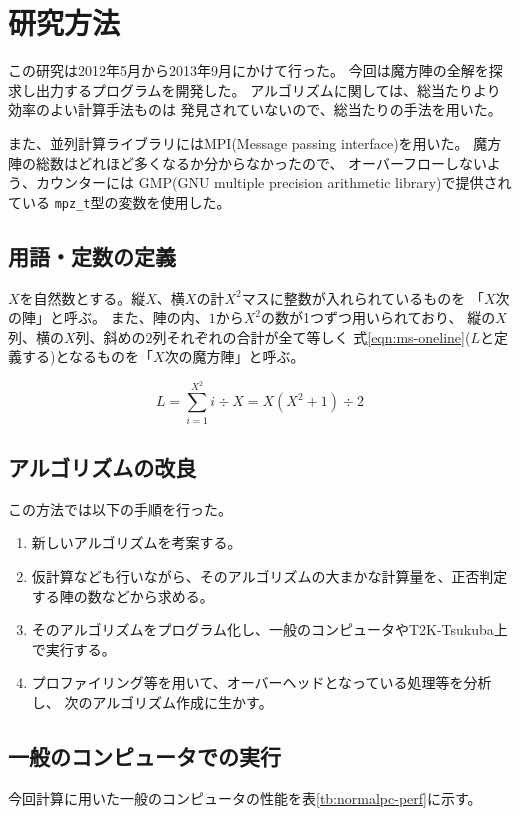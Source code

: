 \section{研究方法}
この研究は2012年5月から2013年9月にかけて行った。
今回は魔方陣の全解を探求し出力するプログラムを開発した。
アルゴリズムに関しては、総当たりより効率のよい計算手法ものは
発見されていないので、総当たりの手法を用いた。

また、並列計算ライブラリにはMPI(Message passing interface)を用いた。
魔方陣の総数はどれほど多くなるか分からなかったので、
オーバーフローしないよう、カウンターには
GMP(GNU multiple precision arithmetic library)で提供されている
{\tt mpz\_t}型の変数を使用した。

\subsection{用語・定数の定義}
$X$を自然数とする。縦$X$、横$X$の計$X^2$マスに整数が入れられているものを
「$X$次の陣」と呼ぶ。
また、陣の内、$1$から$X^2$の数が1つずつ用いられており、
縦の$X$列、横の$X$列、斜めの$2$列それぞれの合計が全て等しく
式\ref{eqn:ms-oneline}($L$と定義する)となるものを「$X$次の魔方陣」と呼ぶ。

\begin{equation} \label{eqn:ms-oneline}
L=\sum_{i=1}^{X^2}i \div X = X(X^2+1) \div 2
\end{equation}


\subsection{アルゴリズムの改良}
この方法では以下の手順を行った。
\begin{enumerate}
	\item 新しいアルゴリズムを考案する。
	\item 仮計算なども行いながら、そのアルゴリズムの大まかな計算量を、正否判定する陣の数などから求める。
	\item そのアルゴリズムをプログラム化し、一般のコンピュータやT2K-Tsukuba上で実行する。
	\item プロファイリング等を用いて、オーバーヘッドとなっている処理等を分析し、
 	次のアルゴリズム作成に生かす。
\end{enumerate}

\subsection{一般のコンピュータでの実行}
今回計算に用いた一般のコンピュータの性能を表\ref{tb:normalpc-perf}に示す。

